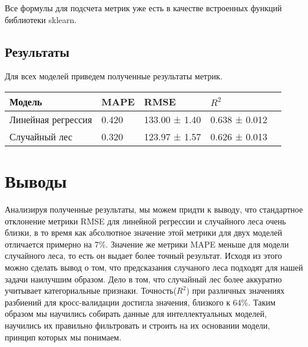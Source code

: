 \documentclass{article}
\begin{document}
Все формулы для подсчета метрик уже есть в качестве встроенных функций библиотеки sklearn. 

\subsection{Результаты}
Для всех моделей приведем полученные результаты метрик.


\begin{center}
    

\begin{tabular}{ | l | l | l | l | l |}
\hline
Модель & MAPE  & RMSE & $R^2$ \\ \hline
Линейная регрессия & 0.420 & 133.00 ± 1.40 & 0.638 ± 0.012\\ \hline
Случайный лес & 0.320 & 123.97 ± 1.57 & 0.626 ± 0.013\\ \hline

\hline
\end{tabular}

\end{center}

\section{Выводы}
Анализируя полученные результаты, мы можем придти к выводу, что стандартное отклонение метрики RMSE для линейной регрессии и случайного леса очень близки, в то время как абсолютное значение этой метрики для двух моделей отличается примерно на 7\%. Значение же метрики MAPE меньше для модели случайного леса, то есть он выдает более точный результат. Исходя из этого можно сделать вывод о том, что предсказания случаного леса подходят для нашей задачи наилучшим образом. Дело в том, что случайный лес более аккуратно учитывает категориальные признаки. Точность(\(R^2\)) при различных значениях разбиений для кросс-валидации достигла значения, близкого к 64\%.
Таким образом мы научились собирать данные для интеллектуальных моделей, научились их правильно фильтровать и строить на их основании модели, принцип которых мы понимаем. 
\end{document}
